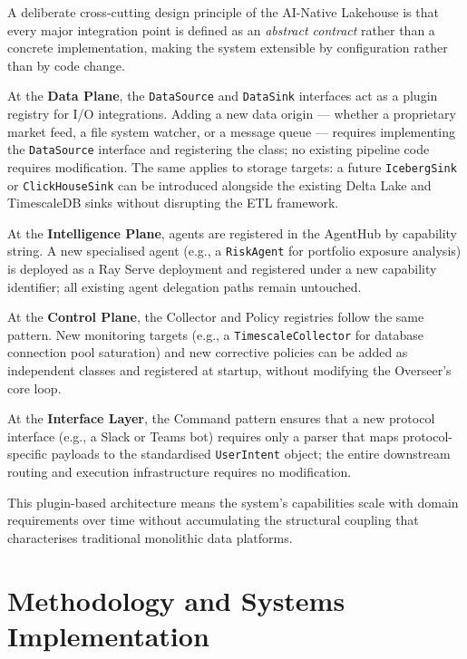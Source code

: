 \documentclass[12pt, a4paper]{report}
\begin{document}
A deliberate cross-cutting design principle of the AI-Native Lakehouse is that every
major integration point is defined as an \emph{abstract contract} rather than a concrete
implementation, making the system extensible by configuration rather than by code change.

At the \textbf{Data Plane}, the \texttt{DataSource} and \texttt{DataSink} interfaces
act as a plugin registry for I/O integrations.
Adding a new data origin — whether a proprietary market feed, a file system watcher, or
a message queue — requires implementing the \texttt{DataSource} interface and registering
the class; no existing pipeline code requires modification.
The same applies to storage targets: a future \texttt{IcebergSink} or
\texttt{ClickHouseSink} can be introduced alongside the existing Delta Lake and
TimescaleDB sinks without disrupting the ETL framework.

At the \textbf{Intelligence Plane}, agents are registered in the AgentHub by capability
string.
A new specialised agent (e.g., a \texttt{RiskAgent} for portfolio exposure analysis)
is deployed as a Ray Serve deployment and registered under a new capability identifier;
all existing agent delegation paths remain untouched.

At the \textbf{Control Plane}, the Collector and Policy registries follow the same
pattern.
New monitoring targets (e.g., a \texttt{TimescaleCollector} for database connection
pool saturation) and new corrective policies can be added as independent classes and
registered at startup, without modifying the Overseer's core loop.

At the \textbf{Interface Layer}, the Command pattern ensures that a new protocol
interface (e.g., a Slack or Teams bot) requires only a parser that maps
protocol-specific payloads to the standardised \texttt{UserIntent} object; the entire
downstream routing and execution infrastructure requires no modification.

This plugin-based architecture means the system's capabilities scale with domain
requirements over time without accumulating the structural coupling that characterises
traditional monolithic data platforms.

\chapter{Methodology and Systems Implementation}
\label{ch:implementation}
\end{document}

